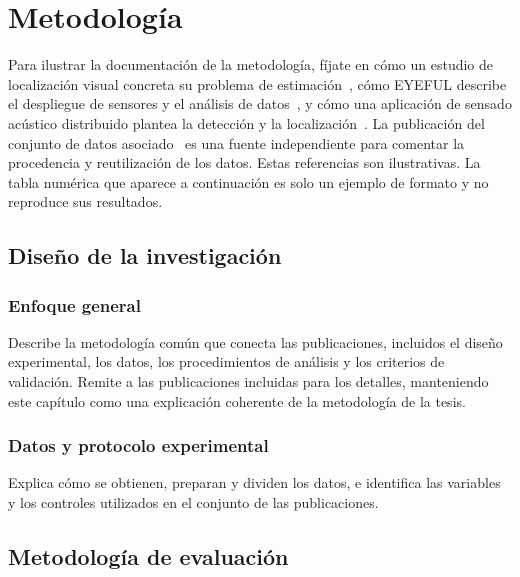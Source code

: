 %

\chapter{Metodología}
\label{cha:compendium-methodology}

Para ilustrar la documentación de la metodología, fíjate en cómo un estudio de localización visual concreta su problema de estimación~\cite{Sanabria2026Landmark}, cómo EYEFUL describe el despliegue de sensores y el análisis de datos~\cite{nieva2023eyeful}, y cómo una aplicación de sensado acústico distribuido plantea la detección y la localización~\cite{ramirez2026jstars}. La publicación del conjunto de datos asociado~\cite{ramireztorres2026distributedacousticsensingdataset} es una fuente independiente para comentar la procedencia y reutilización de los datos. Estas referencias son ilustrativas. La tabla numérica que aparece a continuación es solo un ejemplo de formato y no reproduce sus resultados.

\section{Diseño de la investigación}
\subsection{Enfoque general}

Describe la metodología común que conecta las publicaciones, incluidos el diseño experimental, los datos, los procedimientos de análisis y los criterios de validación. Remite a las publicaciones incluidas para los detalles, manteniendo este capítulo como una explicación coherente de la metodología de la tesis.

\subsection{Datos y protocolo experimental}

Explica cómo se obtienen, preparan y dividen los datos, e identifica las variables y los controles utilizados en el conjunto de las publicaciones.

\section{Metodología de evaluación}

